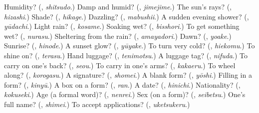 \begin{tcolorbox}[breakable,colback=teal!4,colframe=teal!35!black,title={Before you move on}]
Humidity? (\textbf{}, \emph{shitsudo}.) Damp and humid? (\textbf{}, \emph{jimejime}.) The sun's rays? (\textbf{}, \emph{hizashi}.) Shade? (\textbf{}, \emph{hikage}.) Dazzling? (\textbf{}, \emph{mabushii}.) A sudden evening shower? (\textbf{}, \emph{yūdachi}.) Light rain? (\textbf{}, \emph{kosame}.) Soaking wet? (\textbf{}, \emph{bisshori}.) To get something wet? (\textbf{}, \emph{nurasu}.) Sheltering from the rain? (\textbf{}, \emph{amayadori}.) Dawn? (\textbf{}, \emph{yoake}.) Sunrise? (\textbf{}, \emph{hinode}.) A sunset glow? (\textbf{}, \emph{yūyake}.) To turn very cold? (\textbf{}, \emph{hiekomu}.) To shine on? (\textbf{}, \emph{terasu}.) Hand luggage? (\textbf{}, \emph{tenimotsu}.) A luggage tag? (\textbf{}, \emph{nifuda}.) To carry on one's back? (\textbf{}, \emph{seou}.) To carry in one's arms? (\textbf{}, \emph{kakaeru}.) To wheel along? (\textbf{}, \emph{korogasu}.) A signature? (\textbf{}, \emph{shomei}.) A blank form? (\textbf{}, \emph{yōshi}.) Filling in a form? (\textbf{}, \emph{kinyū}.) A box on a form? (\textbf{}, \emph{ran}.) A date? (\textbf{}, \emph{hinichi}.) Nationality? (\textbf{}, \emph{kokuseki}.) Age (a formal word)? (\textbf{}, \emph{nenrei}.) Sex (on a form)? (\textbf{}, \emph{seibetsu}.) One's full name? (\textbf{}, \emph{shimei}.) To accept applications? (\textbf{}, \emph{uketsukeru}.)
\end{tcolorbox}
